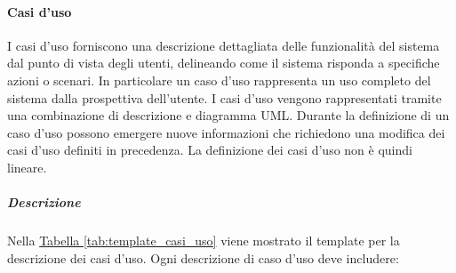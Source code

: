 \paragraph{Casi d'uso}
I casi d'uso forniscono una descrizione dettagliata delle funzionalità del sistema dal punto di vista degli utenti, delineando come il sistema risponda a specifiche azioni o scenari. 
In particolare un caso d'uso rappresenta un uso completo del sistema dalla prospettiva dell'utente.
I casi d'uso vengono rappresentati tramite una combinazione di descrizione e diagramma UML.
Durante la definizione di un caso d'uso possono emergere nuove informazioni che richiedono una modifica dei casi d'uso definiti in precedenza.
La definizione dei casi d'uso non è quindi lineare.

\subparagraph{Descrizione}
Nella \hyperref[tab:template_casi_uso]{Tabella \ref{tab:template_casi_uso}} viene mostrato il template per la descrizione dei casi d'uso.
Ogni descrizione di caso d'uso deve includere:
